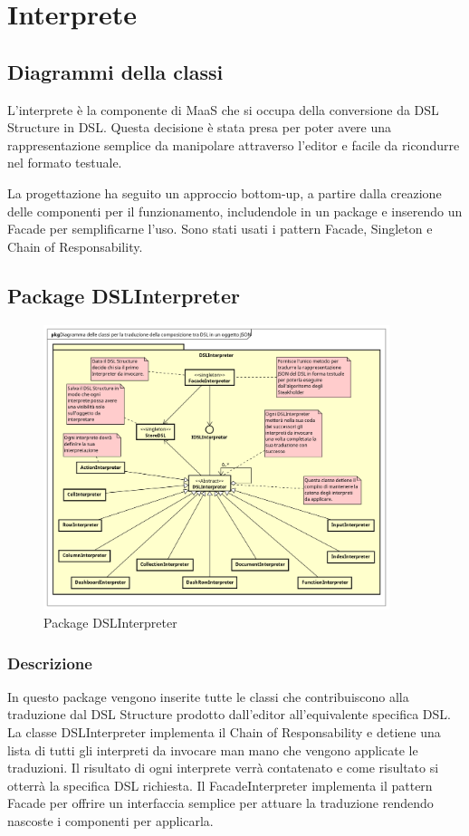 \section{Interprete}
\subsection{Diagrammi della classi}
L'interprete è la componente di MaaS che si occupa della conversione da DSL Structure in DSL. Questa decisione è stata presa per poter avere una rappresentazione semplice da manipolare attraverso l'editor e facile da ricondurre nel formato testuale.

La progettazione ha seguito un approccio bottom-up, a partire dalla creazione delle componenti per il funzionamento, includendole in un package e inserendo un Facade per semplificarne l'uso. Sono stati usati i pattern Facade, Singleton e Chain of Responsability.
\subsection{Package DSLInterpreter}
\begin{figure}[H]
  \centering
  \includegraphics[width=0.9\textwidth]{res/img/Diagram_Interpreter.png}
  \caption{Package DSLInterpreter}
  \label{fig:diagram_interpreter}
\end{figure}
\subsubsection{Descrizione}
In questo package vengono inserite tutte le classi che contribuiscono alla traduzione dal DSL Structure prodotto dall'editor all'equivalente specifica DSL.
La classe DSLInterpreter implementa il Chain of Responsability e detiene una lista di tutti gli interpreti da invocare man mano che vengono applicate le traduzioni. Il risultato di ogni interprete verrà contatenato e come risultato si otterrà la specifica DSL richiesta.
Il FacadeInterpreter implementa il pattern Facade per offrire un interfaccia semplice per attuare la traduzione rendendo nascoste i componenti per applicarla.
